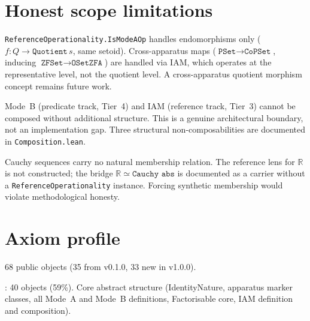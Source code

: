 \section{Honest scope limitations}
\label{sec:apparatus_limitations}

\begin{remark}
\label{rem:limitation1}
\leanok
\texttt{ReferenceOperationality.IsModeAOp} handles endomorphisms only
($f : Q \to \texttt{Quotient}\,s$, same setoid).  Cross-apparatus maps
($\texttt{PSet} \to \texttt{CoPSet}$, inducing $\texttt{ZFSet} \to
\texttt{OSetZFA}$) are handled via IAM, which operates at the representative
level, not the quotient level.  A cross-apparatus quotient morphism concept
remains future work.
\end{remark}

\begin{remark}
\label{rem:limitation2}
\leanok
Mode~B (predicate track, Tier~4) and IAM (reference track, Tier~3) cannot
be composed without additional structure.  This is a genuine architectural
boundary, not an implementation gap.  Three structural non-composabilities
are documented in \texttt{Composition.lean}.
\end{remark}

\begin{remark}
\label{rem:limitation3}
\leanok
Cauchy sequences carry no natural membership relation.  The reference lens
for $\mathbb{R}$ is not constructed; the bridge $\mathbb{R} \simeq
\texttt{Cauchy abs}$ is documented as a carrier without a
\texttt{ReferenceOperationality} instance.  Forcing synthetic membership
would violate methodological honesty.
\end{remark}

\section{Axiom profile}
\label{sec:apparatus_axiom_profile}

68 public objects (35 from v0.1.0, 33 new in v1.0.0).

\axiomprofile{[]}: 40 objects (59\%).
Core abstract structure (IdentityNature, apparatus marker classes,
all Mode~A and Mode~B definitions, Factorisable core, IAM definition and composition).

